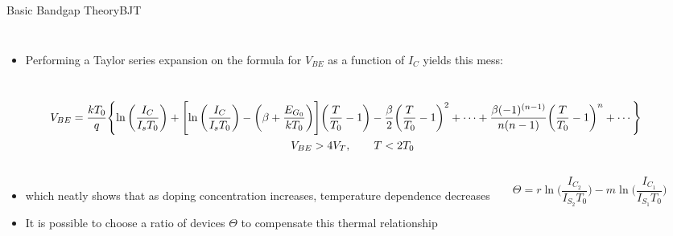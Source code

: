 \documentclass[aspectratio=1610]{beamer} %
\begin{document}
\begin{frame}{Basic Bandgap Theory}{BJT}

    \begin{columns}[T]
        \begin{itemize}
            \item Performing a Taylor series expansion on the formula for \(V_{BE}\) as a function of \(I_C\) yields this mess:
        \end{itemize}
    \end{columns}
    \tiny
    \begin{gather}
        \hspace*{-12pt}
        V_{BE} = \frac{kT_0}{q} \Biggl\{ \ln{\biggl(\frac{I_C}{I_s T_0}\biggr)} + \Biggl[\ln{\biggl(\frac{I_C}{I_s T_0}\biggr)} - \biggl( \beta + \frac{E_{G_0}}{kT_0} \biggr) \Biggr] \biggl( \frac{T}{T_0} - 1 \biggr) \nonumber - \frac{\beta}{2} \biggl( \frac{T}{T_0} - 1 \biggr)^2 + \cdots + \frac{\beta (-1)^{(n-1)}}{n(n-1)} \biggl( \frac{T}{T_0} - 1 \biggr)^n + \cdots \Biggr\}\label{eq:pn_taylor} \\
        V_{BE} > 4V_T,\qquad T < 2T_0 \nonumber
    \end{gather}
    \vspace{-4pt}
    \begin{columns}[c]
        \normalsize
        \begin{itemize}
            \item[] which neatly shows that as doping concentration increases, temperature dependence decreases~\cite{Sah1962}
            \item It is possible to choose a ratio of devices \(\Theta\) to compensate this thermal relationship
        \end{itemize}
        \normalsize
        \begin{equation}
            \Theta = r\ln\biggl(\frac{I_{C_2}}{I_{S_2}T_0}\biggr) - m\ln\biggl(\frac{I_{C_1}}{I_{S_1}T_0}\biggr)\label{eq:ratio}
        \end{equation}
    \end{columns}
    \end{frame}
\end{document}

